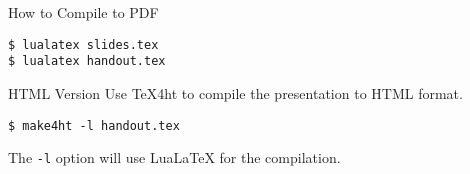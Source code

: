 \begin{frame}[fragile]{How to Compile to PDF} 

\begin{verbatim}
$ lualatex slides.tex
$ lualatex handout.tex
\end{verbatim}
\end{frame}

\begin{frame}[fragile]{HTML Version}
  Use \TeX4ht to compile the presentation to HTML format. 
\begin{verbatim}
$ make4ht -l handout.tex    
\end{verbatim}

The \verb|-l| option will use LuaLaTeX for the compilation.

\end{frame}



